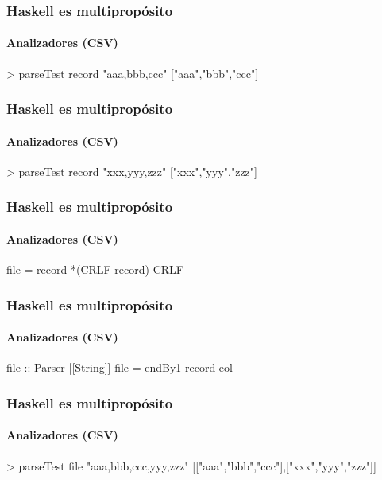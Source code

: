 \documentclass[spanish]{beamer}
\begin{document}

\begin{frame}[fragile]
  \frametitle{Haskell es multipropósito}
  \framesubtitle{Analizadores (CSV)}

  \begin{code}
> parseTest record "aaa,bbb,ccc"
["aaa","bbb","ccc"]
  \end{code}
\end{frame}


\begin{frame}[fragile]
  \frametitle{Haskell es multipropósito}
  \framesubtitle{Analizadores (CSV)}

  \begin{code}
> parseTest record "xxx,yyy,zzz"
["xxx","yyy","zzz"]
  \end{code}
\end{frame}


\begin{frame}[fragile]
  \frametitle{Haskell es multipropósito}
  \framesubtitle{Analizadores (CSV)}

  \begin{code}
file = record *(CRLF record) CRLF
  \end{code}
\end{frame}


\begin{frame}[fragile]
  \frametitle{Haskell es multipropósito}
  \framesubtitle{Analizadores (CSV)}

  \begin{code}
file :: Parser [[String]]
file = endBy1 record eol
  \end{code}
\end{frame}


\begin{frame}[fragile]
  \frametitle{Haskell es multipropósito}
  \framesubtitle{Analizadores (CSV)}

  \begin{code}
> parseTest file "aaa,bbb,ccc\nxxx,yyy,zzz\n"
[["aaa","bbb","ccc"],["xxx","yyy","zzz"]]
  \end{code}
\end{frame}
\end{document}
